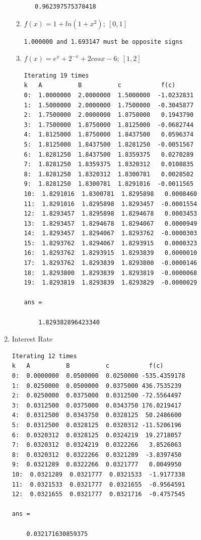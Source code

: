 \documentclass{article}
\begin{document}
\begin{enumerate}
\begin{enumerate}[label=(\alph*)]
\begin{lstlisting}
   0.962397575378418
            \end{lstlisting}
        \item \(f(x) = 1 + ln(1+x^2);\ [0, 1]\)
        \begin{lstlisting}
1.000000 and 1.693147 must be opposite signs
        \end{lstlisting}
        \item \(f(x) = e^x + 2^{-x} + 2cosx - 6;\ [1, 2]\)
        \begin{lstlisting}
Iterating 19 times
k   A          B          c           f(c)
0:  1.0000000  2.0000000  1.5000000  -1.0232831
1:  1.5000000  2.0000000  1.7500000  -0.3045877
2:  1.7500000  2.0000000  1.8750000   0.1943790
3:  1.7500000  1.8750000  1.8125000  -0.0682744
4:  1.8125000  1.8750000  1.8437500   0.0596374
5:  1.8125000  1.8437500  1.8281250  -0.0051567
6:  1.8281250  1.8437500  1.8359375   0.0270289
7:  1.8281250  1.8359375  1.8320312   0.0108835
8:  1.8281250  1.8320312  1.8300781   0.0028502
9:  1.8281250  1.8300781  1.8291016  -0.0011565
10:  1.8291016  1.8300781  1.8295898   0.0008460
11:  1.8291016  1.8295898  1.8293457  -0.0001554
12:  1.8293457  1.8295898  1.8294678   0.0003453
13:  1.8293457  1.8294678  1.8294067   0.0000949
14:  1.8293457  1.8294067  1.8293762  -0.0000303
15:  1.8293762  1.8294067  1.8293915   0.0000323
16:  1.8293762  1.8293915  1.8293839   0.0000010
17:  1.8293762  1.8293839  1.8293800  -0.0000146
18:  1.8293800  1.8293839  1.8293819  -0.0000068
19:  1.8293819  1.8293839  1.8293829  -0.0000029

ans =

    1.829382896423340
        \end{lstlisting}
    \end{enumerate}
    \item Interest Rate
    \begin{lstlisting}
Iterating 12 times
k   A          B          c           f(c)
0:  0.0000000  0.0500000  0.0250000 -535.4359178
1:  0.0250000  0.0500000  0.0375000 436.7535239
2:  0.0250000  0.0375000  0.0312500 -72.5564497
3:  0.0312500  0.0375000  0.0343750 176.0219417
4:  0.0312500  0.0343750  0.0328125  50.2486600
5:  0.0312500  0.0328125  0.0320312 -11.5206196
6:  0.0320312  0.0328125  0.0324219  19.2718057
7:  0.0320312  0.0324219  0.0322266   3.8526063
8:  0.0320312  0.0322266  0.0321289  -3.8397450
9:  0.0321289  0.0322266  0.0321777   0.0049950
10:  0.0321289  0.0321777  0.0321533  -1.9177338
11:  0.0321533  0.0321777  0.0321655  -0.9564591
12:  0.0321655  0.0321777  0.0321716  -0.4757545

ans =

    0.032171630859375
    \end{lstlisting}
\end{enumerate}
\end{document}
